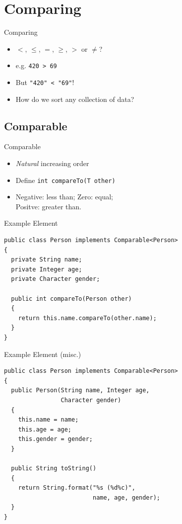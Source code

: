 \documentclass[pdf]{beamer}
\begin{document}
\section{Comparing}
\begin{frame}[fragile]{Comparing}\Large
  \begin{itemize}
    \item $<$, $\le$, $=$, $\ge$, $>$ or $\ne$?
    \item e.g. \verb|420 > 69|
    \item But \verb|"420" < "69"|!
    \item How do we sort any collection of data?
  \end{itemize}
\end{frame}

\subsection{Comparable}
\begin{frame}[fragile]{Comparable}\Large
  \begin{itemize}
    \item \emph{Natural} increasing order
    \item Define \verb|int compareTo(T other)|
    \item Negative: less than; Zero: equal;\\
      Positve: greater than.
  \end{itemize}
\end{frame}

\begin{frame}[fragile]{Example Element}
\begin{verbatim}
public class Person implements Comparable<Person>
{
  private String name;
  private Integer age;
  private Character gender;

  public int compareTo(Person other)
  {
    return this.name.compareTo(other.name);
  }
}
\end{verbatim}
\end{frame}

\begin{frame}[fragile]{Example Element (misc.)}
\begin{verbatim}
public class Person implements Comparable<Person>
{
  public Person(String name, Integer age,
                Character gender)
  {
    this.name = name;
    this.age = age;
    this.gender = gender;
  }

  public String toString()
  {
    return String.format("%s (%d%c)",
                         name, age, gender);
  }
}
\end{verbatim}
\end{frame}
\end{document}
